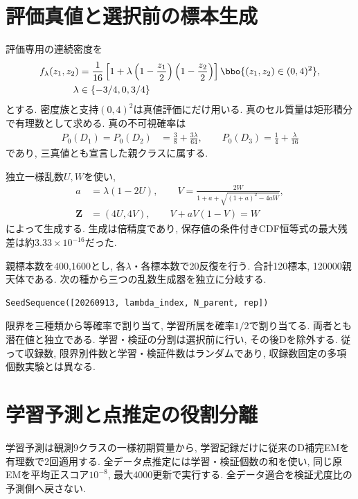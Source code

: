 \section{評価真値と選択前の標本生成}
\label{sec:stage22_generation}

評価専用の連続密度を
\begin{align}
f_\lambda(z_1,z_2)
&=\frac1{16}\left[1+\lambda
\left(1-\frac{z_1}{2}\right)\left(1-\frac{z_2}{2}\right)\right]
\bbo\{(z_1,z_2)\in(0,4)^2\},
\label{eq:stage22_true_density}\\
\lambda&\in\{-3/4,0,3/4\}
\label{eq:stage22_lambda}
\end{align}
とする. 密度族と支持$(0,4)^2$は真値評価にだけ用いる.
真のセル質量は矩形積分で有理数として求める.
真の不可視確率は
\begin{align}
P_0(D_1)=P_0(D_2)&=\frac38+\frac{3\lambda}{64},\qquad
P_0(D_3)=\frac14+\frac{\lambda}{16}
\label{eq:stage22_true_missing}
\end{align}
であり, 三真値とも宣言した親クラスに属する.

独立一様乱数$U,W$を使い,
\begin{align}
a&=\lambda(1-2U),\qquad
V=\frac{2W}{1+a+\sqrt{(1+a)^2-4aW}},
\label{eq:stage22_sampler}\\
\bm Z&=(4U,4V),\qquad V+aV(1-V)=W
\label{eq:stage22_conditional_cdf}
\end{align}
によって生成する. 生成は倍精度であり,
保存値の条件付きCDF恒等式の最大残差は約$3.33\times10^{-16}$だった.

親標本数を400,1600とし, 各$\lambda$・各標本数で20反復を行う.
合計120標本, 120000親天体である.
次の種から三つの乱数生成器を独立に分岐する.
\begin{verbatim}
SeedSequence([20260913, lambda_index, N_parent, rep])
\end{verbatim}
限界を三種類から等確率で割り当て,
学習所属を確率$1/2$で割り当てる. 両者とも潜在値と独立である.
学習・検証の分割は選択前に行い, その後Dを除外する.
従って収録数, 限界別件数と学習・検証件数はランダムであり,
収録数固定の多項個数実験とは異なる.

\section{学習予測と点推定の役割分離}
\label{sec:stage22_estimation}

学習予測は観測9クラスの一様初期質量から,
学習記録だけに従来のD補完EMを有理数で2回適用する.
全データ点推定には学習・検証個数の和を使い,
同じ原EMを平均正スコア$10^{-8}$, 最大4000更新で実行する.
全データ適合を検証尤度比の予測側へ戻さない.


